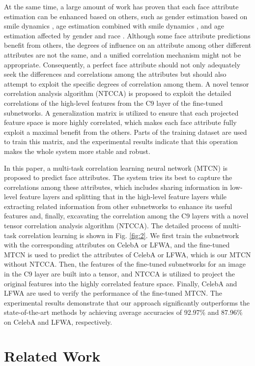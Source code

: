 \documentclass{sig-alternate-05-2015}
\begin{document}
At the same time, a large amount of work has proven that each face attribute estimation can be enhanced based on others, such as gender estimation based on smile dynamics \cite{7755833}, age estimation combined with smile dynamics \cite{7060650}, and age estimation affected by gender and race \cite{5543609}. Although some face attribute predictions benefit from others, the degrees of influence on an attribute among other different attributes are not the same, and a unified correlation mechanism might not be appropriate. Consequently, a perfect face attribute should not only adequately seek the differences and correlations among the attributes but should also attempt to exploit the specific degrees of correlation among them. A novel tensor correlation analysis algorithm (NTCCA) is proposed to exploit the detailed correlations of the high-level features from the C9 layer of the fine-tuned subnetworks. A generalization matrix is utilized to ensure that each projected feature space is more highly correlated, which makes each face attribute fully exploit a maximal benefit from the others. Parts of the training dataset are used to train this matrix, and the experimental results indicate that this operation makes the whole system more stable and robust.

In this paper, a multi-task correlation learning neural network (MTCN) is proposed to predict face attributes. The system tries its best to capture the correlations among these attributes, which includes sharing information in low-level feature layers and splitting that in the high-level feature layers while extracting related information from other subnetworks to enhance its useful features and, finally, excavating the correlation among the C9 layers with a novel tensor correlation analysis algorithm (NTCCA). The detailed process of multi-task correlation learning is shown in Fig. \ref{fig:2}. We first train the subnetwork with the corresponding attributes on CelebA or LFWA, and the fine-tuned MTCN is used to predict the attributes of CelebA or LFWA, which is our MTCN without NTCCA. Then, the features of the fine-tuned subnetworks for an image in the C9 layer are built into a tensor, and NTCCA is utilized to project the original features into the highly correlated feature space. Finally, CelebA and LFWA are used to verify the performance of the fine-tuned MTCN. The experimental results demonstrate that our approach significantly outperforms the state-of-the-art methods by achieving average accuracies of 92.97\% and 87.96\% on CelebA and LFWA, respectively.
\section{Related Work }
\end{document}

